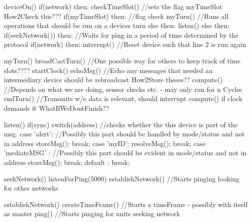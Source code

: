 deviceOn()
    if(network) then:
        checkTimeSlot()                                                 //sets the flag myTimeSlot                                                            How2Check this???
        if(myTimeSlot) then:                                            //flag check
            myTurn()                                                    //Runs all operations that should be run on a devices turn
        else then:
            listen()
    else then:
        if(seekNetwork()) then:                                         //Waits for ping in a period of time determined by the protocol
            if(network) then:
                interrupt()                                             //Reset device such that line 2 is run again                                        


myTurn()                                                         
    broadCastTurn()                                                     //One possible way for others to keep track of time slots????
    startClock()
    echoMsg()                                                           //Echo any messages that needed an intermediary device should be rebroadcast         How2Store theses??
    compute()                                                           //Depends on what we are doing, sensor checks etc. - may only run for n Cycles
    endTurn()                                                           //Transmits w/e data is relevant, should interrupt compute() if clock demands it     WhatIfWeDontFinish??


listen()
    if(sync)
        switch(address)                                                 //checks whether the this device is part of the msg.
        {
        case 'alert':                                                   //Possibly this part should be handled by mode/status and not in address
            storeMsg();
            break;
        case 'myID':
            resolveMsg();
            break;
        case 'mediateMSG' :                                             //Possibly this part should be evident in mode/status and not in address
            storeMsg();
            break;
        default :
            break;
        }    


seekNetwork()
    listenForPing(5000)
    establishNetwork()                                                  //Starts pinging looking for other networks


establishNetwork()
    createTimeFrame()                                                   //Starts a timeFrame - possibly with itself as master
    ping()                                                              //Starts pinging for units seeking network


